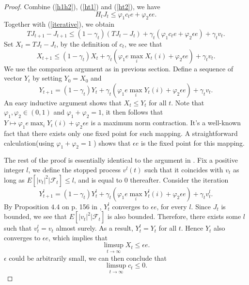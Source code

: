 \documentclass[12pt,a4paper]{amsart}
\numberwithin{equation}{section}
\theoremstyle{plain}
\theoremstyle{definition}
\begin{document}
\begin{proof}
	Combine (\ref{h1h2}), (\ref{ht1}) and (\ref{ht2}), we have
	\begin{equation} \label{h}
		H_t J_t \le  \varphi_1 c_t e + \varphi_2 \epsilon e. 
	\end{equation}
	Together with (\ref{iterative}), we obtain
	\begin{equation}
		TJ_{t+1} - J_{t+1} \le (1-\gamma_t) \left(TJ_t - J_t\right) + \gamma_t (\varphi_1 c_t e + \varphi_2 \epsilon e) + \gamma_t v_t. 
	\end{equation}
	Set $X_t = TJ_t - J_t $, by the definition of $c_t$, we see that
	$$
	X_{t+1 } \le (1-\gamma_t) X_t + \gamma_t (\varphi_1 e \max_{i} X_t(i)  + \varphi_2 \epsilon e) + \gamma_t v_t. 
	$$
	We use the comparison argument as in previous section. Define a sequence of vector $Y_t$ by setting $Y_0 = X_0$ and 
	$$
	Y_{t+1 } = (1-\gamma_t) Y_t + \gamma_t (\varphi_1 e \max_{i}  Y_t(i)  + \varphi_2 \epsilon e) + \gamma_t v_t.
	$$
	An easy inductive argument shows that $X_t \le Y_t$ for all $t$. Note that $\varphi_1, \varphi_2 \in (0, 1)$ and $\varphi_1 + \varphi_2 = 1$, it then follows that $Y \mapsto \varphi_1 e \max_{i}  Y_t(i)  + \varphi_2 \epsilon e $ is a maximum norm contraction. It's a well-known fact that there exists only one fixed point for such mapping. A straightforward calculation(using $\varphi_1 + \varphi_2 = 1$ ) shows that $\epsilon e$ is the fixed point for this mapping. 
	
	The rest of the proof is essentially identical to the argument in \cite{Ts03}. Fix a positive integer $l$, we define the stopped process $v^l(t)$ such that it coincides with $v_t$ as long as $E\left[|v_t|^2 | \mathcal{F}_t\right] \le l$, and is equal to 0 thereafter. Consider the iteration
	$$
	Y_{t+1}^l = (1-\gamma_t) Y_t^l + \gamma_t (\varphi_1 e \max_{i} Y_t^l(i) + \varphi_2 \epsilon e) + \gamma_t v_t^l. 
	$$
	By Proposition 4.4 on p. 156 in \cite{BertsekasTsitsiklis96}, $Y_t^l$ converges to $\epsilon e$, for every $l$. Since $J_t$ is bounded, we see that $E\left[|v_t|^2 | \mathcal{F}_t\right] $ is also bounded.  Therefore, there exists some $l$ such that $v_t^l = v_t$ almost surely. As a result, $Y_t^l = Y_t$ for all $t$. Hence $Y_t$ also converges to $\epsilon e$, which implies that
	$$
	\limsup_{t \to \infty} X_t \le \epsilon e. 
 	$$ 
 	$\epsilon$ could be arbitrarily small, we can then conclude that
 	$$
 	\limsup_{t \to \infty} c_t \le  0. 
 	$$ 
\end{proof}
\end{document}
